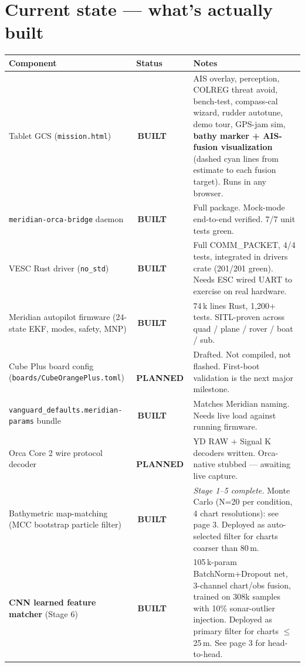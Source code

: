 \documentclass[10pt,a4paper]{article}
\newcommand{\statusbuilt}{{\color{white}\colorbox{mSafe}{\small\bfseries\,BUILT\,}}}
\newcommand{\statusplan}{{\color{white}\colorbox{mWarn}{\small\bfseries\,PLANNED\,}}}
\begin{document}
\pagebreak

\section{Current state — what's actually built}
\begin{tabularx}{\textwidth}{@{}l l X@{}}
\toprule
\textbf{Component} & \textbf{Status} & \textbf{Notes} \\
\midrule
\rowcolor{mRow} Tablet GCS (\texttt{mission.html}) & \statusbuilt & AIS overlay, perception, COLREG threat avoid, bench-test, compass-cal wizard, rudder autotune, demo tour, GPS-jam sim, \textbf{bathy marker + AIS-fusion visualization} (dashed cyan lines from estimate to each fusion target). Runs in any browser. \\
\texttt{meridian-orca-bridge} daemon & \statusbuilt & Full package. Mock-mode end-to-end verified. 7/7 unit tests green. \\
\rowcolor{mRow} VESC Rust driver (\texttt{no\_std}) & \statusbuilt & Full COMM\_PACKET, 4/4 tests, integrated in drivers crate (201/201 green). Needs ESC wired UART to exercise on real hardware. \\
Meridian autopilot firmware (24-state EKF, modes, safety, MNP) & \statusbuilt & 74\,k lines Rust, 1{,}200+ tests. SITL-proven across quad / plane / rover / boat / sub. \\
\rowcolor{mRow} Cube Plus board config (\texttt{boards/CubeOrangePlus.toml}) & \statusplan & Drafted. Not compiled, not flashed. First-boot validation is the next major milestone. \\
\texttt{vanguard\_defaults.meridian-params} bundle & \statusbuilt & Matches Meridian naming. Needs live load against running firmware. \\
\rowcolor{mRow} Orca Core 2 wire protocol decoder & \statusplan & YD RAW + Signal K decoders written. Orca-native stubbed — awaiting live capture. \\
Bathymetric map-matching (MCC bootstrap particle filter) & \statusbuilt & \textit{Stage 1--5 complete.} Monte Carlo (N=20 per condition, 4 chart resolutions): see page 3. Deployed as auto-selected filter for charts coarser than 80\,m. \\
\rowcolor{mRow} \textbf{CNN learned feature matcher} (Stage 6) & \statusbuilt & 105\,k-param BatchNorm+Dropout net, 3-channel chart/obs fusion, trained on 308k samples with 10\% sonar-outlier injection. Deployed as primary filter for charts $\leq$25\,m. See page 3 for head-to-head. \\

\end{tabularx}
\end{document}
